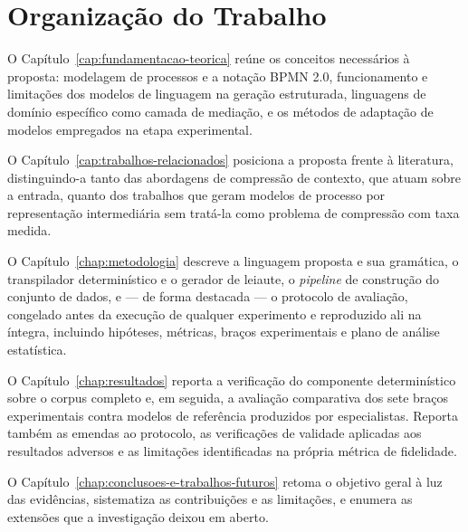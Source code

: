 \section{Organização do Trabalho}
\label{sec:organizacao}

O Capítulo~\ref{cap:fundamentacao-teorica} reúne os conceitos necessários à proposta: modelagem de processos e a notação BPMN 2.0, funcionamento e limitações dos modelos de linguagem na geração estruturada, linguagens de domínio específico como camada de mediação, e os métodos de adaptação de modelos empregados na etapa experimental.

O Capítulo~\ref{cap:trabalhos-relacionados} posiciona a proposta frente à literatura, distinguindo-a tanto das abordagens de compressão de contexto, que atuam sobre a entrada, quanto dos trabalhos que geram modelos de processo por representação intermediária sem tratá-la como problema de compressão com taxa medida.

O Capítulo~\ref{chap:metodologia} descreve a linguagem proposta e sua gramática, o transpilador determinístico e o gerador de leiaute, o \textit{pipeline} de construção do conjunto de dados, e --- de forma destacada --- o protocolo de avaliação, congelado antes da execução de qualquer experimento e reproduzido ali na íntegra, incluindo hipóteses, métricas, braços experimentais e plano de análise estatística.

O Capítulo~\ref{chap:resultados} reporta a verificação do componente determinístico sobre o corpus completo e, em seguida, a avaliação comparativa dos sete braços experimentais contra modelos de referência produzidos por especialistas. Reporta também as emendas ao protocolo, as verificações de validade aplicadas aos resultados adversos e as limitações identificadas na própria métrica de fidelidade.

O Capítulo~\ref{chap:conclusoes-e-trabalhos-futuros} retoma o objetivo geral à luz das evidências, sistematiza as contribuições e as limitações, e enumera as extensões que a investigação deixou em aberto.
